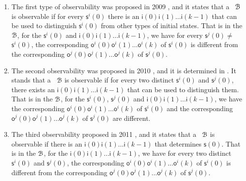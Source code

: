 
\begin{enumerate}
	\item The first type of observability was proposed in 2009 \cite{cheng2009controllability}, and it states that a \BCN\ ${\mathcal{B}}$ is observable if for every $\mathsf{s}^{i}(0)$ there is an $\mathsf{i}(0)\mathsf{i}(1)\ldots\mathsf{i}(k-1)$ that can be used to distinguish $\mathsf{s}^{i}(0)$ from other types of initial states. That is in the ${\mathcal{B}}$, for the $\mathsf{s}^{i}(0)$ and $\mathsf{i}(0)$$\mathsf{i}(1)\ldots$$\mathsf{i}(k-1)$, we have for every $\mathsf{s}^{j}(0)\ne$$\mathsf{s}^{i}(0)$, the corresponding $\mathsf{o}^{i}(0)$$\mathsf{o}^{i}(1)\ldots$$\mathsf{o}^{i}(k)$ of $\mathsf{s}^{i}(0)$ is different from the corresponding $\mathsf{o}^{j}(0)$$\mathsf{o}^{j}(1)\ldots$$\mathsf{o}^{j}(k)$ of $\mathsf{s}^{j}(0)$. %
	\item 
	The second observability was proposed in 2010 \cite{Zhao2010Input}, and it is determined in \cite{Li2015Controllability}. It stands that a \BCN\ ${\mathcal{B}}$ is observable if for every two distinct $\mathsf{s}^{i}(0)$ and $\mathsf{s}^{j}(0)$, there exists an $\mathsf{i}(0)$$\mathsf{i}(1)\ldots$$\mathsf{i}(k-1)$ that can be used to distinguish them. That is in the ${\mathcal{B}}$, for the $\mathsf{s}^{i}(0)$, $\mathsf{s}^{j}(0)$ and $\mathsf{i}(0)\mathsf{i}(1)\ldots\mathsf{i}(k-1)$, we have the corresponding $\mathsf{o}^{i}(0)\mathsf{o}^{i}(1)\ldots\mathsf{o}^{i}(k)$ of $\mathsf{s}^{i}(0)$ and the corresponding $\mathsf{o}^{j}(0)\mathsf{o}^{j}(1)\ldots\mathsf{o}^{j}(k)$ of $\mathsf{s}^{j}(0)$ are different. %
	\item The third observability proposed in 2011 \cite{Cheng2011Identification}, and it states that a \BCN\ ${\mathcal{B}}$ is observable if there is an $\mathsf{i}(0)$$\mathsf{i}(1)\ldots$$\mathsf{i}(k-1)$ that determines $\mathsf{s}(0)$. That is in the ${\mathcal{B}}$, for the $\mathsf{i}(0)$$\mathsf{i}(1)\ldots$$\mathsf{i}(k-1)$, we have for every two distinct $\mathsf{s}^{i}(0)$ and $\mathsf{s}^{j}(0)$, the corresponding $\mathsf{o}^{i}(0)$$\mathsf{o}^{i}(1)\ldots$$\mathsf{o}^{i}(k)$ of $\mathsf{s}^{i}(0)$ is different from the corresponding $\mathsf{o}^{j}(0)$$\mathsf{o}^{j}(1)\ldots$$\mathsf{o}^{j}(k)$ of $\mathsf{s}^{j}(0)$.
	

\end{enumerate}
